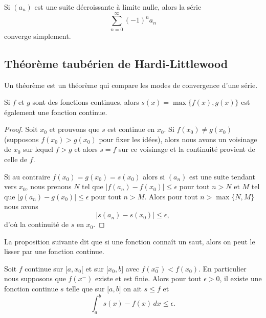 \begin{corollary}       \label{CoreMjIfw}
    Si \( (a_n)\) est une suite décroissante à limite nulle, alors la série
  \begin{equation}
    \sum_{n=0}^\infty {(-1)}^n a_n
  \end{equation}
  converge simplement.
\end{corollary}

\subsection{Théorème taubérien de Hardi-Littlewood}

Un théorème  est un théorème qui compare les modes de convergence d'une série.

\begin{lemma}
    Si \( f\) et \( g\) sont des fonctions continues, alors \( s(x)=\max\{ f(x),g(x) \}\) est également une fonction continue.
\end{lemma}

\begin{proof}
    Soit \( x_0\) et prouvons que \( s\) est continue en \( x_0\). Si \( f(x_0)\neq g(x_0)\) (supposons \( f(x_0)>g(x_0)\) pour fixer les idées), alors nous avons un voisinage de \( x_0\) sur lequel \( f>g\) et alors \( s=f\) sur ce voisinage et la continuité provient de celle de \( f\).

    Si au contraire \( f(x_0)=g(x_0)=s(x_0)\) alors si \( (a_n)\) est une suite tendant vers \( x_0\), nous prenons \( N\) tel que \( \big| f(a_n)-f(x_0) \big|\leq \epsilon\) pour tout \( n>N\) et \( M\) tel que \( \big| g(a_n)-g(x_0) \big|\leq \epsilon\) pour tout \( n> M\). Alors pour tout \( n>\max\{ N,M \}\) nous avons
    \begin{equation}
        \big| s(a_n)-s(x_0) \big|\leq \epsilon,
    \end{equation}
    d'où la continuité de \( s\) en \( x_0\).
\end{proof}

La proposition suivante dit que si une fonction connaît un saut, alors on peut le lisser par une fonction continue.
\begin{proposition} \label{PropTIeYVw}
    Soit \( f\) continue sur \( \mathopen[ a , x_0 [\) et sur \( \mathopen[ x_0 , b \mathclose]\) avec \( f(x_0^-)<f(x_0)\). En particulier nous supposons que \( f(x^-)\) existe et est finie. Alors pour tout \( \epsilon>0\), il existe une fonction continue \( s\) telle que sur \( \mathopen[ a , b \mathclose]\) on ait \( s\leq f\) et
    \begin{equation}
        \int_a^bs(x)-f(x)\,dx\leq \epsilon.
    \end{equation}
\end{proposition}

